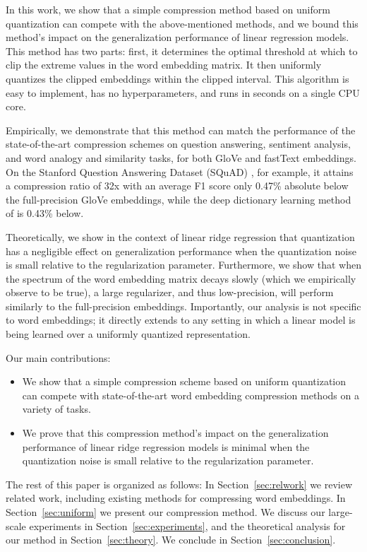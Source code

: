 In this work, we show that a simple compression method based on uniform quantization can compete with the above-mentioned methods, and we bound this method's impact on the generalization performance of linear regression models.
This method has two parts: first, it determines the optimal threshold at which to clip the extreme values in the word embedding matrix.
It then uniformly quantizes the clipped embeddings within the clipped interval.
This algorithm is easy to implement, has no hyperparameters, and runs in seconds on a single CPU core.

Empirically, we demonstrate that this method can match the performance of the state-of-the-art compression schemes on question answering, sentiment analysis, and word analogy and similarity tasks, for both GloVe \citep{glove14} and fastText \citep{fasttext18} embeddings.
On the Stanford Question Answering Dataset (SQuAD) \citep{squad16}, for example, it attains a compression ratio of 32x with an average F1 score only 0.47\% absolute below the full-precision GloVe embeddings, while the deep dictionary learning method of \citet{dccl17} is 0.43\% below.

Theoretically, we show in the context of linear ridge regression that quantization has a negligible effect on generalization performance when the quantization noise is small relative to the regularization parameter.
Furthermore, we show that when the spectrum of the word embedding matrix decays slowly (which we empirically observe to be true), a large regularizer, and thus low-precision, will perform similarly to the full-precision embeddings.
Importantly, our analysis is not specific to word embeddings; it directly extends to any setting in which a linear model is being learned over a uniformly quantized representation.

Our main contributions:
\begin{itemize}
	\item We show that a simple compression scheme based on uniform quantization can compete with state-of-the-art word embedding compression methods on a variety of tasks.
	\item We prove that this compression method's impact on the generalization performance of linear ridge regression models is minimal when the quantization noise is small relative to the regularization parameter.
\end{itemize}

The rest of this paper is organized as follows:
In Section~\ref{sec:relwork} we review related work, including existing methods for compressing word embeddings.
In Section~\ref{sec:uniform} we present our compression method.
We discuss our large-scale experiments in Section~\ref{sec:experiments}, and the theoretical analysis for our method in Section~\ref{sec:theory}.
We conclude in Section~\ref{sec:conclusion}.
